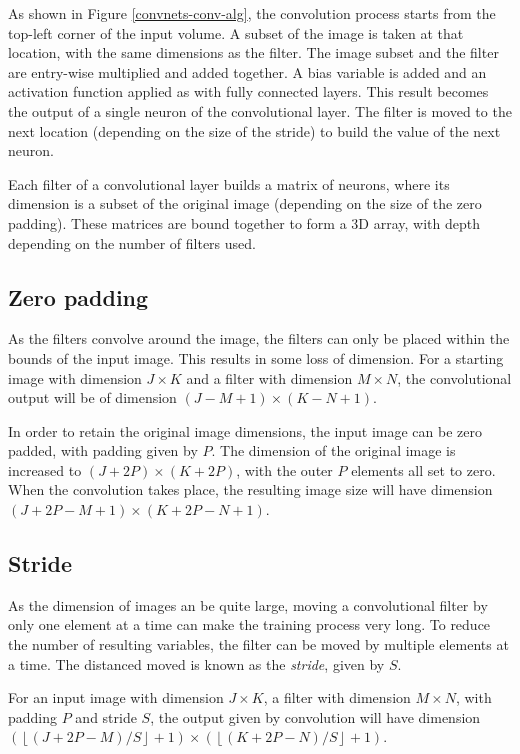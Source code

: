 As shown in Figure \ref{convnets-conv-alg}, the convolution process starts from the top-left corner of the input volume. A subset of the image is taken at that location, with the same dimensions as the filter. The image subset and the filter are entry-wise multiplied and added together. A bias variable is added and an activation function applied as with fully connected layers. This result becomes the output of a single neuron of the convolutional layer. The filter is moved to the next location (depending on the size of the stride) to build the value of the next neuron.

Each filter of a convolutional layer builds a matrix of neurons, where its dimension is a subset of the original image (depending on the size of the zero padding). These matrices are bound together to form a 3D array, with depth depending on the number of filters used.

\subsection*{Zero padding}\label{convnets-pad}

As the filters convolve around the image, the filters can only be placed within the bounds of the input image. This results in some loss of dimension. For a starting image with dimension $J \times K$ and a filter with dimension $M \times N$, the convolutional output will be of dimension $(J - M + 1)\times (K - N + 1)$.

In order to retain the original image dimensions, the input image can be zero padded, with padding given by $P$. The dimension of the original image is increased to $(J+2P) \times (K+2P)$, with the outer $P$ elements all set to zero. When the convolution takes place, the resulting image size will have dimension $(J+2P - M + 1) \times (K + 2P - N + 1)$.

\subsection*{Stride}\label{convnets-stride}

As the dimension of images an be quite large, moving a convolutional filter by only one element at a time can make the training process very long. To reduce the number of resulting variables, the filter can be moved by multiple elements at a time. The distanced moved is known as the \textit{stride}, given by $S$.

For an input image with dimension $J \times K$, a filter with dimension $M \times N$, with padding $P$ and stride $S$, the output given by convolution will have dimension $\left(\left\lfloor (J + 2P - M)/S\right\rfloor + 1\right) \times \left(\left\lfloor (K + 2P - N)/S \right\rfloor + 1\right)$.

